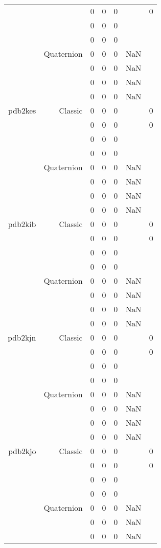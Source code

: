 \begin{xltabular}{\textwidth}{r|rcccSc}
& & 0 & 0 & 0 & & 0 \\
& & 0 & 0 & 0 & & \\
& & 0 & 0 & 0 & & \\
& Quaternion & 0 & 0 & 0 & NaN & \\
& & 0 & 0 & 0 & NaN & \\
& & 0 & 0 & 0 & NaN & \\
& & 0 & 0 & 0 & NaN & \\ \addlinespace
pdb2kes & Classic & 0 & 0 & 0 & & 0 \\
& & 0 & 0 & 0 & & 0 \\
& & 0 & 0 & 0 & & \\
& & 0 & 0 & 0 & & \\
& Quaternion & 0 & 0 & 0 & NaN & \\
& & 0 & 0 & 0 & NaN & \\
& & 0 & 0 & 0 & NaN & \\
& & 0 & 0 & 0 & NaN & \\ \addlinespace
pdb2kib & Classic & 0 & 0 & 0 & & 0 \\
& & 0 & 0 & 0 & & 0 \\
& & 0 & 0 & 0 & & \\
& & 0 & 0 & 0 & & \\
& Quaternion & 0 & 0 & 0 & NaN & \\
& & 0 & 0 & 0 & NaN & \\
& & 0 & 0 & 0 & NaN & \\
& & 0 & 0 & 0 & NaN & \\ \addlinespace
pdb2kjn & Classic & 0 & 0 & 0 & & 0 \\
& & 0 & 0 & 0 & & 0 \\
& & 0 & 0 & 0 & & \\
& & 0 & 0 & 0 & & \\
& Quaternion & 0 & 0 & 0 & NaN & \\
& & 0 & 0 & 0 & NaN & \\
& & 0 & 0 & 0 & NaN & \\
& & 0 & 0 & 0 & NaN & \\ \addlinespace
pdb2kjo & Classic & 0 & 0 & 0 & & 0 \\
& & 0 & 0 & 0 & & 0 \\
& & 0 & 0 & 0 & & \\
& & 0 & 0 & 0 & & \\
& Quaternion & 0 & 0 & 0 & NaN & \\
& & 0 & 0 & 0 & NaN & \\
& & 0 & 0 & 0 & NaN & \\

\end{xltabular}
